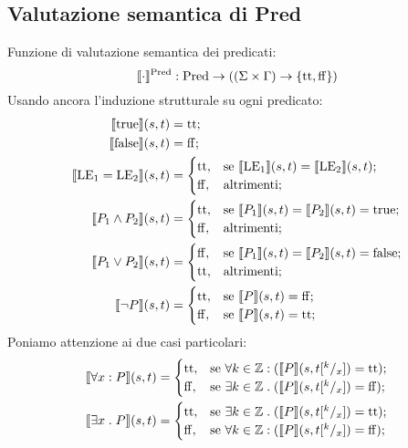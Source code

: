 \subsection{Valutazione semantica di Pred}
Funzione di valutazione semantica dei predicati:
\[
\llbracket \cdot \rrbracket ^{\mathrm{Pred}}: \mathrm{Pred} \rightarrow ((\Sigma \times \Gamma) \rightarrow \{\mathrm{tt},\mathrm{ff} \})
\]
Usando ancora l'induzione strutturale su ogni predicato:
\begin{align*}
   \llbracket \mathrm{true} \rrbracket(s,t)
      &= \mathrm{tt};\\
   \llbracket \mathrm{false} \rrbracket(s,t)
      &= \mathrm{ff};\\
   \llbracket \mathrm{LE}_1 = \mathrm{LE}_2\rrbracket(s,t)
      &=
        \begin{cases}
                \mathrm{tt}, &\text{se $\llbracket\mathrm{LE}_1\rrbracket(s,t) = \llbracket \mathrm{LE}_2 \rrbracket(s,t)$};\\
                \mathrm{ff}, &\text{altrimenti};
        \end{cases}\\
    \llbracket P_1 \land P_2\rrbracket(s,t)
      &=
        \begin{cases}
                \mathrm{tt}, &\text{se $\llbracket P_1\rrbracket(s,t) = \llbracket P_2\rrbracket(s,t) = \mathrm{true}$};\\
                \mathrm{ff}, &\text{altrimenti};
        \end{cases}\\
    \llbracket P_1 \lor P_2\rrbracket(s,t)
      &=
        \begin{cases}
                \mathrm{ff}, &\text{se $\llbracket P_1\rrbracket(s,t) = \llbracket P_2\rrbracket(s,t) = \mathrm{false}$};   \\
                \mathrm{tt}, &\text{altrimenti};
        \end{cases} \\
    \llbracket \neg P\rrbracket(s,t)
       &=
        \begin{cases}
                \mathrm{tt},&\text{se $\llbracket P\rrbracket(s,t) = \mathrm{ff}$};\\
                \mathrm{ff},&\text{se $\llbracket P\rrbracket(s,t) = \mathrm{tt}$};
        \end{cases}
\end{align*}
Poniamo attenzione ai due casi particolari:
\begin{align*}
   \llbracket\forall x \mathrel{:} P\rrbracket(s,t)
      &=
        \begin{cases}
                \mathrm{tt}, &\text{se $\forall k\in\mathbb{Z}\mathrel{:}(\llbracket P\rrbracket(s,t[^k/_x]) = \mathrm{tt}$});\\
                \mathrm{ff}, &\text{se $\exists k\in\mathbb{Z}\mathrel{.}(\llbracket P\rrbracket(s,t[^k/_x]) = \mathrm{ff}$});
        \end{cases}\\
   \llbracket \exists x \mathrel{.} P\rrbracket(s,t)
      &=
        \begin{cases}
                \mathrm{tt},  &\text{se $\exists k\in \mathbb{Z}\mathrel{.}(\llbracket P\rrbracket(s,t[^ k/_x]) = \mathrm{tt}$});\\
                \mathrm{ff},  &\text{se $\forall k\in \mathbb{Z}\mathrel{:}(\llbracket P\rrbracket(s,t[^k/_x]) = \mathrm{ff}$});
        \end{cases}
\end{align*}
